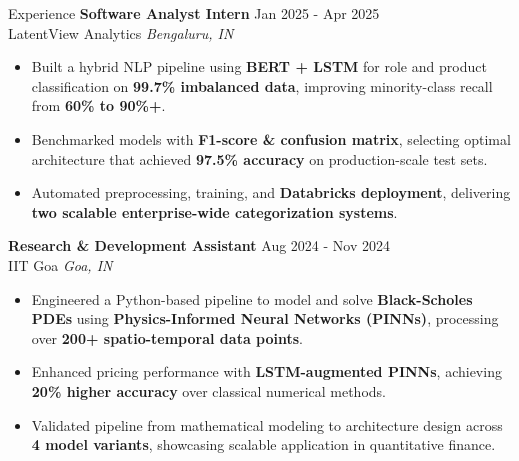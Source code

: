 \documentclass{resume}
\begin{document}
\begin{rSection}{Experience}
\textbf{Software Analyst Intern} \hfill Jan 2025 - Apr 2025 \\
LatentView Analytics \hfill \textit{Bengaluru, IN}
\vspace{-6pt}
\begin{itemize}
    \itemsep -6pt
    \item Built a hybrid NLP pipeline using \textbf{BERT + LSTM} for role and product classification on \textbf{99.7\% imbalanced data}, improving minority-class recall from \textbf{60\% to 90\%+}.
    \item Benchmarked models with \textbf{F1-score \& confusion matrix}, selecting optimal architecture that achieved \textbf{97.5\% accuracy} on production-scale test sets.
    \item Automated preprocessing, training, and \textbf{Databricks deployment}, delivering \textbf{two scalable enterprise-wide categorization systems}.
\end{itemize}
\textbf{Research \& Development Assistant} \hfill Aug 2024 - Nov 2024 \\
IIT Goa \hfill \textit{Goa, IN}
\vspace{-6pt}
\begin{itemize}
    \itemsep -6pt
    \item Engineered a Python-based pipeline to model and solve \textbf{Black-Scholes PDEs} using \textbf{Physics-Informed Neural Networks (PINNs)}, processing over \textbf{200+ spatio-temporal data points}.
    \item Enhanced pricing performance with \textbf{LSTM-augmented PINNs}, achieving \textbf{20\% higher accuracy} over classical numerical methods.
    \item Validated pipeline from mathematical modeling to architecture design across \textbf{4 model variants}, showcasing scalable application in quantitative finance.
\end{itemize}
\end{rSection}
\vspace{-6pt}
\end{document}
